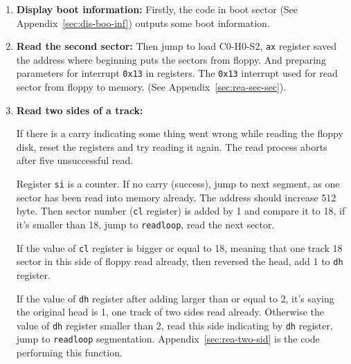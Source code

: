\documentclass{swfcthesis}
\begin{document}
\begin{enumerate}
\item \textbf{Display boot information:} Firstly, the code in boot sector (See
  Appendix~\ref{sec:dis-boo-inf}) outputs some boot information. 
\item \textbf{Read the second sector:} Then jump to load C0-H0-S2, \texttt{ax} register
  saved the address where beginning puts the sectors from floppy. And preparing parameters
  for interrupt \texttt{0x13} in registers. The \texttt{0x13} interrupt used for read
  sector from floppy to memory. (See Appendix~\ref{sec:rea-sec-sec}).
\item \textbf{Read two sides of a track:}
  
  If there is a carry indicating some thing went wrong while reading the floppy disk,
  reset the registers and try reading it again. The read process aborts after five
  unsuccessful read.

  Register \texttt{si} is a counter. If no carry (success), jump to next segment, as one
  sector has been read into memory already. The address should increase 512 byte. Then
  sector number (\texttt{cl} register) is added by 1 and compare it to 18, if it's smaller
  than 18, jump to \texttt{readloop}, read the next sector.

  If the value of \texttt{cl} register is bigger or equal to 18, meaning that one track
  18 sector in this side of floppy read already, then reversed the head, add 1 to
  \texttt{dh} register.

  If the value of \texttt{dh} register after adding larger than or equal to 2, it's saying
  the original head is 1, one track of two sides read already. Otherwise the value of
  \texttt{dh} register smaller than 2, read this side indicating by \texttt{dh} register,
  jump to \texttt{readloop} segmentation. Appendix~\ref{sec:rea-two-sid} is the code 
  performing this function.


\end{enumerate}
\end{document}
